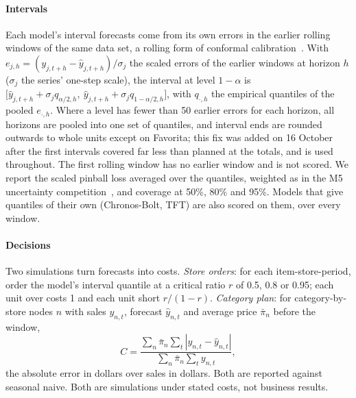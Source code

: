 \paragraph{Intervals}
Each model's interval forecasts come from its own errors in the earlier rolling
windows of the same data set, a rolling form of conformal
calibration~\cite{vovk2005}. With $e_{j,h} = (y_{j,t+h} - \hat y_{j,t+h})/\sigma_j$
the scaled errors of the earlier windows at horizon $h$ ($\sigma_j$ the series'
one-step scale), the interval at level $1-\alpha$ is
$\big[\hat y_{j,t+h} + \sigma_j q_{\alpha/2,h},\ \hat y_{j,t+h} + \sigma_j
q_{1-\alpha/2,h}\big]$, with $q_{\cdot,h}$ the empirical quantiles of the pooled
$e_{\cdot,h}$. Where a level has fewer than 50
earlier errors for each horizon, all horizons are pooled into one set of
quantiles, and interval ends are rounded outwards to whole units except on
Favorita; this fix was added on 16 October after the first intervals covered
far less than planned at the totals, and is used throughout. The first
rolling window has no earlier window and is not scored. We report the scaled
pinball loss averaged over the quantiles, weighted as in the M5 uncertainty
competition~\cite{m5uncertainty}, and coverage at 50\%, 80\% and 95\%. Models
that give quantiles of their own (Chronos-Bolt, TFT) are also scored on them,
over every window.

\paragraph{Decisions}
Two simulations turn forecasts into costs. \emph{Store orders}: for each
item-store-period, order the model's interval quantile at a critical ratio $r$
of 0.5, 0.8 or 0.95; each unit over costs 1 and each unit short $r/(1-r)$.
\emph{Category plan}: for category-by-store nodes $n$ with sales $y_{n,t}$,
forecast $\hat y_{n,t}$ and average price $\bar\pi_n$ before the window,
\begin{equation}
C = \frac{\sum_n \bar\pi_n \sum_{t} |y_{n,t} - \hat y_{n,t}|}{\sum_n \bar\pi_n \sum_t y_{n,t}},
\end{equation}
the absolute error in dollars over sales in dollars. Both are reported against seasonal naive. Both are simulations under stated
costs, not business results.

